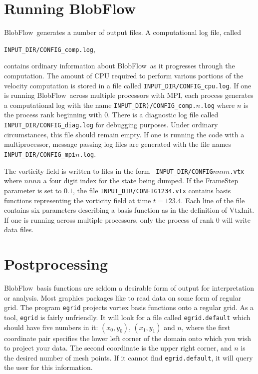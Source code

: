 \documentclass[12pt]{report}
\newcommand{\BF}{BlobFlow}
\begin{document}
\section{Running \BF}

\BF~generates a number of output files.  A computational log file,
called
\begin{center}
{\tt INPUT\_DIR/CONFIG\_comp.log},
\end{center}
 contains ordinary information
about
\BF~as it progresses through the computation.  The amount of CPU required to
perform various portions of the velocity computation is stored in a file called
{\tt INPUT\_DIR/CONFIG\_cpu.log}. If one is running
\BF~across multiple processors with MPI, each process generates a computational
log with
the name {\tt INPUT\_DIR)/CONFIG\_comp.$n$.log} where $n$ is the process rank
beginning with 0.  There is a diagnostic log file called {\tt
INPUT\_DIR/CONFIG\_diag.log} for debugging purposes.  Under ordinary
circumstances, this file should remain empty.  If one is running the
code with a multiprocessor, message passing log files are generated with the
file names {\tt INPUT\_DIR/CONFIG\_mpi$n$.log}.

The vorticity field is written to files in the form {\tt
INPUT\_DIR/CONFIG$nnnn$.vtx} where $nnnn$ a four digit index for the state
being dumped.  If the FrameStep parameter is set to $0.1$, the file
{\tt INPUT\_DIR/CONFIG1234.vtx} contains basis functions representing the
vorticity field at time $t=123.4$.  Each line of the file contains six
parameters describing a basis function as in the definition of VtxInit.  
If one is running across multiple
processors, only the process of rank 0 will write data files.

\section{Postprocessing}

\BF~basis functions are seldom a desirable form of output for
interpretation or analysis.  Most graphics packages like to read data on
some form of regular grid.  The program {\tt egrid} projects 
vortex basis functions onto a regular
grid.  As a tool, {\tt egrid} is fairly unfriendly.  It will look for a file
called {\tt egrid.default} which should have five numbers in it:
$(x_0,y_0)$, $(x_1,y_1)$ and $n$, where the first coordinate pair specifies
the lower left corner of the domain onto which you wish to project your
data.  The second coordinate is the upper right corner, and $n$ is the
desired number of mesh points.  If it cannot find {\tt egrid.default}, it
will query the user for this information.
\end{document}
